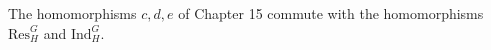 The homomorphisms $c, d, e$ of Chapter 15 commute with the homomorphisms $\text{Res}_H^G$ and $\text{Ind}_H^G$.

